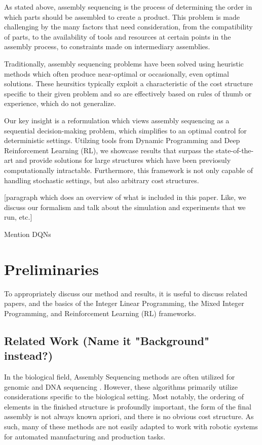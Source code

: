 \documentclass{article}
\begin{document}
As stated above, assembly sequencing is the process of determining the order in which parts should be assembled to create a product. This problem is made challenging by the many factors that need consideration, from the compatibility of parts, to the availability of tools and resources at certain points in the assembly process, to constraints made on intermediary assemblies.

Traditionally, assembly sequencing problems have been solved using heuristic methods which often produce near-optimal or occasionally, even optimal solutions. These heursitics typically exploit a characteristic of the cost structure specific to their given problem and so are effectively based on rules of thumb or experience, which do not generalize.

Our key insight is a reformulation which views assembly sequencing as a sequential decision-making problem, which simplifies to an optimal control for deterministic settings. Utilzing tools from Dynamic Programming and Deep Reinforcement Learning (RL), we showcase results that surpass the state-of-the-art and provide solutions for large structures which have been previosuly computationally intractable. Furthermore, this framework is not only capable of handling stochastic settings, but also arbitrary cost structures. 

\color{red}
[paragraph which does an overview of what is included in this paper. Like, we discuss our formalism and talk about the simulation and experiments that we run, etc.]

Mention DQNs
\color{black}


\section{Preliminaries}
To appropriately discuss our method and results, it is useful to discuss related papers, and the basics of the Integer Linear Programming, the Mixed Integer Programming, and Reinforcement Learning (RL) frameworks.

\subsection{Related Work (Name it "Background" instead?)}
In the biological field, Assembly Sequencing methods are often  utilized for genomic and DNA sequencing \citep{Miller2010}\citep{Dohm2007}\citep{WarnkeSommer2016}. However, these algorithms primarily  utilize considerations specific to the biological setting. Most notably, the ordering of elements in the finished structure is profoundly important, the form of the final assembly is not always known apriori, and there is no obvious cost structure. As such, many of these methods are not easily adapted to work with robotic systems for automated manufacturing and production tasks.
\end{document}
